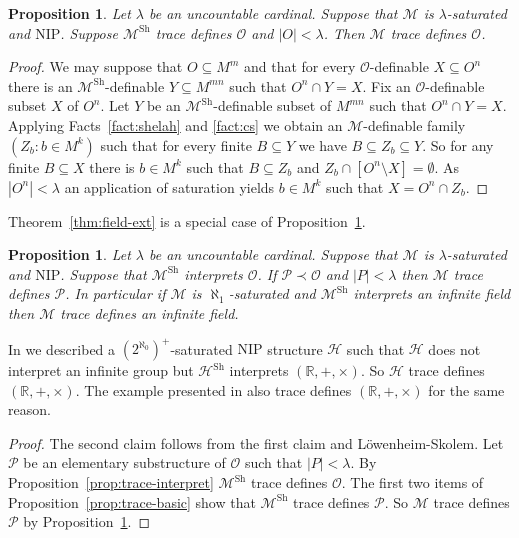 \documentclass[bibalpha]{amsart}
\newtheorem{prop}[theorem]{Proposition}
\theoremstyle{definition}
\theoremstyle{remark}
\newcommand{\Sh}[1]{\ensuremath{\mathscr{#1}^{\mathrm{Sh}}}}
\newcommand{\nip}{\mathrm{NIP}}
\newcommand{\Sa}[1]{\ensuremath{\mathscr{#1}}}
\newcommand{\R}{\mathbb{R}}
\begin{document}
\begin{prop}
\label{prop:trace-new}
Let $\lambda$ be an uncountable cardinal.
Suppose that $\Sa M$ is $\lambda$-saturated and $\nip$.
Suppose $\Sh M$ trace defines $\Sa O$ and $|O| < \lambda$.
Then $\Sa M$ trace defines $\Sa O$.
\end{prop}

\begin{proof}
We may suppose that $O \subseteq M^m$ and that for every $\Sa O$-definable $X \subseteq O^n$ there is an $\Sh M$-definable $Y \subseteq M^{mn}$ such that $O^n \cap Y = X$.
Fix an $\Sa O$-definable subset $X$ of $O^n$.
Let $Y$ be an $\Sh M$-definable subset of $M^{mn}$ such that $O^n \cap Y = X$.
Applying Facts~\ref{fact:shelah} and \ref{fact:cs} we obtain an $\Sa M$-definable family $(Z_b : b \in M^k)$ such that for every finite $B \subseteq Y$ we have $B \subseteq Z_b \subseteq Y$.
So for any finite $B \subseteq X$ there is $b \in M^k$ such that $B \subseteq Z_b$ and $Z_b \cap [O^n \setminus X] = \emptyset$.
As $|O^n| < \lambda$ an application of saturation yields $b \in M^k$ such that $X = O^n \cap Z_b$.
\end{proof}

\noindent
Theorem~\ref{thm:field-ext} is a special case of Proposition~\ref{prop:field-ext-str}.

\begin{prop}
\label{prop:field-ext-str}
Let $\lambda$ be an uncountable cardinal.
Suppose that $\Sa M$ is $\lambda$-saturated and $\nip$.
Suppose that $\Sh M$ interprets $\Sa O$.
If $\Sa P \prec \Sa O$ and $|P| < \lambda$ then $\Sa M$ trace defines $\Sa P$.
In particular if $\Sa M$ is $\aleph_1$-saturated and $\Sh M$ interprets an infinite field then $\Sa M$ trace defines an infinite field.
\end{prop}

\noindent
In \cite{field-in-Shelah} we described a $(2^{\aleph_0})^+$-saturated $\nip$ structure $\Sa H$ such that $\Sa H$ does not interpret an infinite group but $\Sh H$ interprets $(\R,+,\times)$.
So $\Sa H$ trace defines $(\R,+,\times)$.
The example presented in \cite{big-nip} also trace defines $(\R,+,\times)$ for the same reason.

\begin{proof}
The second claim follows from the first claim and L\"owenheim-Skolem.
Let $\Sa P$ be an elementary substructure of $\Sa O$ such that $|P| < \lambda$.
By Proposition~\ref{prop:trace-interpret} $\Sh M$ trace defines $\Sa O$.
The first two items of Proposition~\ref{prop:trace-basic} show that $\Sh M$ trace defines $\Sa P$.
So $\Sa M$ trace defines $\Sa P$ by Proposition~\ref{prop:trace-new}.
\end{proof}
\end{document}
